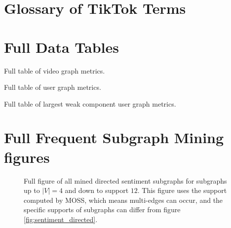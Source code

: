 \label{appendix}

\section{Glossary of TikTok Terms}\label{glossary}
\begin{center}
\begin{minipage}{\textwidth}  %
    \renewcommand{\glossaryname}{}
    \glsaddallunused
    \small
    \printglossaries
\end{minipage}
\end{center}



\section{Full Data Tables}\label{lab:table_appendix}
\begin{sidewaystable}[!h]
    \centering
    \scalebox{0.72}{
        
    }
    \caption{Full table of video graph metrics.}
    \label{tab:full_video_table}
\end{sidewaystable}

\begin{sidewaystable}[!h]
    \centering
    \caption{Full table of user graph metrics.}
    \label{tab:full_user_table}
\end{sidewaystable}

\begin{sidewaystable}[!h]
    \centering
    \scalebox{0.72}{
        
    }
    \caption{Full table of largest weak component user graph metrics.}
    \label{tab:full_user_lcc_table}
\end{sidewaystable}


\clearpage
\section{Full Frequent Subgraph Mining figures}\label{lab:fsm_appendix}
\begin{figure}[!htbp]
    \centering
    \begin{adjustwidth}{-\textwidth}{-\textwidth}
        \centering
        
    \end{adjustwidth}
    \caption{Full figure of all mined directed sentiment subgraphs for subgraphs up to $|V|=4$ and down to support $12$. This figure uses the support computed by MOSS, which means multi-edges can occur, and the specific supports of subgraphs can differ from figure \ref{fig:sentiment_directed}.}
    \label{fig:sentiment_directed_full}
\end{figure}


